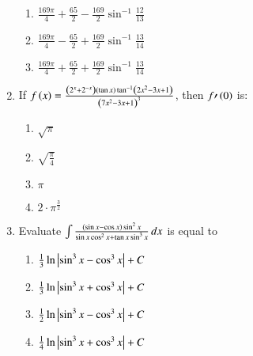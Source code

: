 \documentclass[journal,12pt,twocolumn]{IEEEtran}
\theoremstyle{remark}
\begin{document}
\begin{enumerate}[start=1]
\begin{enumerate}
    \item $\frac{169 \pi}{4} + \frac{65}{2} - \frac{169}{2} \sin^{-1} \frac{12}{13}$
    \item $\frac{169 \pi}{4} - \frac{65}{2} + \frac{169}{2} \sin^{-1} \frac{13}{14}$
    \item $\frac{169 \pi}{4} + \frac{65}{2} + \frac{169}{2} \sin^{-1} \frac{13}{14}$
\end{enumerate}
\item If $f\left(x\right) = \frac{\left(2^x +2^{-x}\right)\left(\tan x\right)\tan^{-1} \left(2x^2 - 3x + 1\right)}{\left(7x^2 - 3x +1\right)^3}$, then $f\prime\left(0\right)$ is:
\begin{enumerate}
    \item $\sqrt{\pi}$
    \item $\sqrt{\frac{\pi}{4}}$
    \item $\pi$
    \item $2\cdot\pi^\frac{3}{2}$
\end{enumerate}
\item Evaluate $\int \frac{\left(\sin x - \cos x\right) \sin^2 x}{\sin x\cos^2 x + \tan x\sin^3 x} \, dx$ is equal to
\begin{enumerate}
    \item $\frac{1}{3} \ln \left\vert\sin^3 x - \cos^3 x\right\vert + C$
    \item $\frac{1}{3} \ln \left\vert\sin^3 x + \cos^3 x\right\vert + C$
    \item $\frac{1}{2} \ln \left\vert\sin^3 x - \cos^3 x\right\vert + C$
    \item $\frac{1}{4} \ln \left\vert\sin^3 x + \cos^3 x\right\vert + C$
\end{enumerate}
\end{enumerate}
\end{document}
